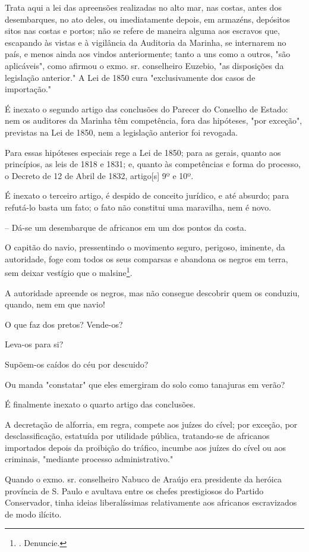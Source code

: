 Trata aqui a lei das apreensões realizadas no alto mar, nas costas,
antes dos desembarques, no ato deles, ou imediatamente depois, em
armazéns, depósitos sitos nas costas e portos; não se refere de maneira
alguma aos escravos que, escapando às vistas e à vigilância da Auditoria
da Marinha, se internarem no país, e menos ainda aos vindos
anteriormente; tanto a uns como a outros, "são aplicáveis", como afirmou
o exmo. sr. conselheiro Euzebio, "as disposições da legislação
anterior." A Lei de 1850 cura "exclusivamente dos casos de importação."

É inexato o segundo artigo das conclusões do Parecer do Conselho de
Estado: nem os auditores da Marinha têm competência, fora das hipóteses,
"por exceção", previstas na Lei de 1850, nem a legislação anterior foi
revogada.

Para essas hipóteses especiais rege a Lei de 1850; para as gerais,
quanto aos princípios, as leis de 1818 e 1831; e, quanto às competências
e forma do processo, o Decreto de 12 de Abril de 1832, artigo{[}s{]} 9º
e 10º.

É inexato o terceiro artigo, é despido de conceito jurídico, e até
absurdo; para refutá-lo basta um fato; o fato não constitui uma
maravilha, nem é novo.

-- Dá-se um desembarque de africanos em um dos pontos da costa.

O capitão do navio, pressentindo o movimento seguro, perigoso, iminente,
da autoridade, foge com todos os seus comparsas e abandona os negros em
terra, sem deixar vestígio que o malsine\footnote{. Denuncie.}.

A autoridade apreende os negros, mas não consegue descobrir quem os
conduziu, quando, nem em que navio!

O que faz dos pretos? Vende-os?

Leva-os para si?

Supõem-os caídos do céu por descuido?

Ou manda "constatar" que eles emergiram do solo como tanajuras em verão?

É finalmente inexato o quarto artigo das conclusões.

A decretação de alforria, em regra, compete aos juízes do cível; por
exceção, por desclassificação, estatuída por utilidade pública,
tratando-se de africanos importados depois da proibição do tráfico,
incumbe aos juízes do cível ou aos criminais, "mediante processo
administrativo."

Quando o exmo. sr. conselheiro Nabuco de Araújo era presidente da
heróica província de S. Paulo e avultava entre os chefes prestigiosos do
Partido Conservador, tinha ideias liberalíssimas relativamente aos
africanos escravizados de modo ilícito.

